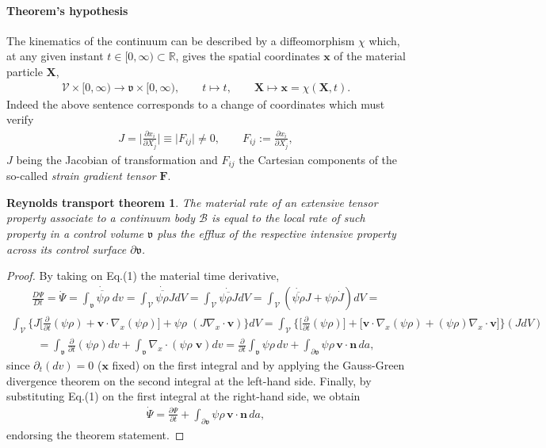 \documentclass[12pt]{article}
\newtheorem{theorem*}{Reynolds transport theorem}
\begin{document}
\paragraph{Theorem's hypothesis}
The kinematics of the continuum can be described by a diffeomorphism $\chi$ which, at any given instant $t\in [0,\infty)\subset\mathbb{R}$, gives the spatial coordinates $\mathbf{x}$ of the material particle $\mathbf{X}$,
\begin{align*}
\mathscr{V}\times[0,\infty)\rightarrow \mathfrak{v}\times[0,\infty), \qquad
t \mapsto t, \qquad \mathbf{X}\mapsto\mathbf{x}=\chi(\mathbf{X},t).
\end{align*}
Indeed the above sentence corresponds to a change of coordinates which must verify
\begin{align*}
J=\bigg\vert\frac{\partial{x}_i}{\partial{X}_j}\bigg\vert\equiv
\big\vert{F_{ij}}\big\vert\neq{0}, \qquad 
F_{ij}:=\frac{\partial{x}_i}{\partial{X}_j},
\end{align*} 
$J$ being the Jacobian of transformation and $F_{ij}$ the Cartesian components of the so-called {\em strain gradient tensor} $\mathbf{F}$.
\begin{theorem*} 
The material rate of an extensive tensor property associate to a continuum body $\mathscr{B}$ is equal to the local rate of such property in a control volume $\mathfrak{v}$ plus the efflux of the respective intensive property across its control surface $\partial\mathfrak{v}$. 
\end{theorem*}
\begin{proof}
By taking on Eq.(1) the material time derivative,
\begin{align*}
\frac{D\Psi}{Dt}=\dot{\Psi}=\dot{\overline{\int_{\mathfrak{v}}\psi\rho\;dv}}=
\dot{\overline{\int_{\mathscr{V}}\psi\rho{J}dV}}=
\int_{\mathscr{V}}\dot{\overline{\psi\rho{J}}}dV=
\int_{\mathscr{V}}(\dot{\overline{\psi\rho}}J+\psi\rho\dot{J})dV=
\end{align*}
\begin{align*}
\int_{\mathscr{V}}\Big\{J\Big[\frac{\partial}{\partial{t}}(\psi\rho)+
\mathbf{v}\!\cdot\!\nabla_x(\psi\rho)\Big]+
\psi\rho\;(J\nabla_x\!\cdot\!\mathbf{v})\Big\}dV=
\int_{\mathscr{V}}\Big\{\Big[\frac{\partial}{\partial{t}}(\psi\rho)\Big]
+\big[\mathbf{v}\!\cdot\!\nabla_x(\psi\rho)+
(\psi\rho)\nabla_x\!\cdot\!\mathbf{v}\big]\Big\}(JdV)
\end{align*}
\begin{align*}
=\int_{\mathfrak{v}}\frac{\partial}{\partial{t}}(\psi\rho)dv+
\int_{\mathfrak{v}}\nabla_x\!\cdot\!(\psi\rho\;\mathbf{v})dv=
\frac{\partial}{\partial{t}}\int_{\mathfrak{v}}\psi\rho\,dv+
\int_{\partial\mathfrak{v}}\psi\rho\,\mathbf{v}\!\cdot\!\mathbf{n}\,da,
\end{align*}
since $\partial_t(dv)=0$ ($\mathbf{x}$ fixed) on the first integral and by applying the Gauss-Green divergence theorem on the second integral at the left-hand side. Finally, by substituting Eq.(1) on the first integral at the right-hand side, we obtain
\begin{align}
\dot{\Psi}=\frac{\partial\Psi}{\partial{t}}+
\int_{\partial\mathfrak{v}}\psi\rho\,\mathbf{v}\!\cdot\!\mathbf{n}\,da,
\end{align}
endorsing the theorem statement.
\end{proof}
\end{document}
